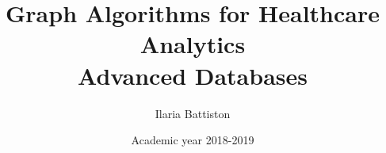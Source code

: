 \documentclass{article}
\title{Graph Algorithms for Healthcare Analytics \\[0.2em] \smaller{}Advanced Databases}
\author{Ilaria Battiston}
\date{Academic year 2018-2019}
\begin{document}
	
	\maketitle
	
	\lfoot{}
	\cfoot{}
	\rfoot{\thepage}
	
	\newpage
	
	 
\end{document}
